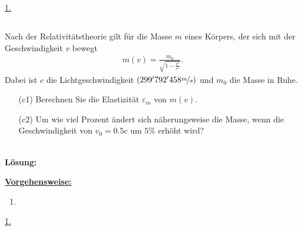 \underline{1. }\\



\newpage
\subsection*{}
Nach der Relativitätstheorie gilt für die Masse $ m $ eines Körpers, der sich mit der Geschwindigkeit $ v $ bewegt
\begin{align*}
	m(v)
	=
	\frac{m_0}{\sqrt{1 - \frac{v^2}{c^2}}}.
\end{align*}
Dabei ist $ c $ die Lichtgeschwindigkeit $ (299'792'458 \nicefrac{m}{s}) $ und $ m_0 $ die Masse in Ruhe.
\begin{enumerate}
	\item[(c1)] Berechnen Sie die Elastizität $ \varepsilon_m $ von $ m(v) $.
	\item[(c2)] Um wie viel Prozent ändert sich näherungsweise die Masse, wenn die Geschwindigkeit von $ v_0 = 0.5c $ um $ 5 \% $ erhöht wird?
\end{enumerate}
\ \\
\textbf{Lösung:}
\begin{mdframed}
\underline{\textbf{Vorgehensweise:}}
\begin{enumerate}
\item 
\end{enumerate}
\end{mdframed}

\underline{1.}\\


\newpage
